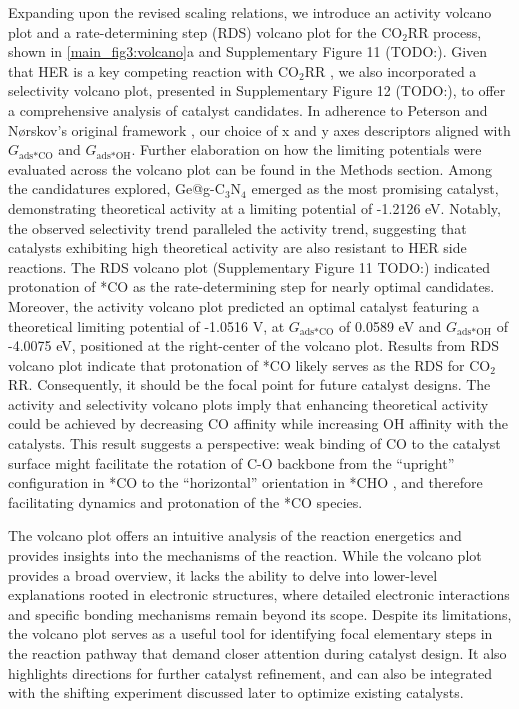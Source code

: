 Expanding upon the revised scaling relations, we introduce an activity volcano plot and a rate-determining step (RDS) volcano plot for the CO$_2$RR process, shown in \cref{main_fig3:volcano}a and Supplementary Figure 11 (TODO:).
Given that HER is a key competing reaction with CO$_2$RR \cite{goyal2020competition}, we also incorporated a selectivity volcano plot, presented in Supplementary Figure 12 (TODO:), to offer a comprehensive analysis of catalyst candidates.
In adherence to Peterson and Nørskov's original framework \cite{peterson2012activity}, our choice of x and y axes descriptors aligned with $\textit{G}_{\text{ads} \ast \text{CO}}$ and $\textit{G}_{\text{ads} \ast \text{OH}}$.
Further elaboration on how the limiting potentials were evaluated across the volcano plot can be found in the Methods section.
Among the candidatures explored, Ge@g-C$_3$N$_4$ emerged as the most promising catalyst, demonstrating theoretical activity at a limiting potential of -1.2126 eV.
Notably, the observed selectivity trend paralleled the activity trend, suggesting that catalysts exhibiting high theoretical activity are also resistant to HER side reactions.
The RDS volcano plot (Supplementary Figure 11 TODO:) indicated protonation of *CO as the rate-determining step for nearly optimal candidates.
Moreover, the activity volcano plot predicted an optimal catalyst featuring a theoretical limiting potential of -1.0516 V, at $\textit{G}_{\text{ads} \ast \text{CO}}$ of 0.0589 eV and $\textit{G}_{\text{ads} \ast \text{OH}}$ of -4.0075 eV, positioned at the right-center of the volcano plot.
Results from RDS volcano plot indicate that protonation of *CO likely serves as the RDS for CO$_2$RR.
Consequently, it should be the focal point for future catalyst designs.
The activity and selectivity volcano plots imply that enhancing theoretical activity could be achieved by decreasing CO affinity while increasing OH affinity with the catalysts.
This result suggests a perspective: weak binding of CO to the catalyst surface might facilitate the rotation of C-O backbone from the “upright” configuration in *CO to the “horizontal” orientation in *CHO \cite{peterson2010copper},
and therefore facilitating dynamics and protonation of the *CO species.

The volcano plot offers an intuitive analysis of the reaction energetics and provides insights into the mechanisms of the reaction.
While the volcano plot provides a broad overview, it lacks the ability to delve into lower-level explanations rooted in electronic structures, where detailed electronic interactions and specific bonding mechanisms remain beyond its scope.
Despite its limitations, the volcano plot serves as a useful tool for identifying focal elementary steps in the reaction pathway that demand closer attention during catalyst design.
It also highlights directions for further catalyst refinement, and can also be integrated with the shifting experiment discussed later to optimize existing catalysts.

